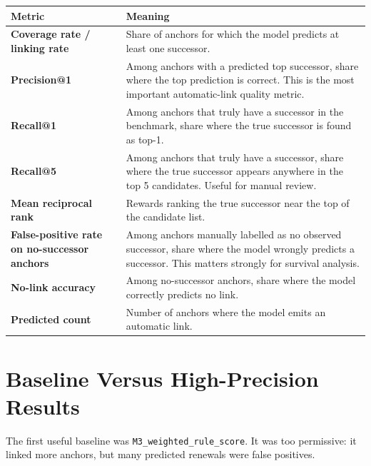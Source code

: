 \documentclass[11pt,a4paper]{article}
\newcommand{\code}[1]{\texttt{#1}}
\newcommand{\metric}[1]{\textbf{#1}}
\begin{document}
\small
\begin{longtable}{p{}p{}}
\toprule
Metric & Meaning \\
\midrule
\endhead
\metric{Coverage rate / linking rate} & Share of anchors for which the model predicts at least one successor. \\
\metric{Precision@1} & Among anchors with a predicted top successor, share where the top prediction is correct. This is the most important automatic-link quality metric. \\
\metric{Recall@1} & Among anchors that truly have a successor in the benchmark, share where the true successor is found as top-1. \\
\metric{Recall@5} & Among anchors that truly have a successor, share where the true successor appears anywhere in the top 5 candidates. Useful for manual review. \\
\metric{Mean reciprocal rank} & Rewards ranking the true successor near the top of the candidate list. \\
\metric{False-positive rate on no-successor anchors} & Among anchors manually labelled as no observed successor, share where the model wrongly predicts a successor. This matters strongly for survival analysis. \\
\metric{No-link accuracy} & Among no-successor anchors, share where the model correctly predicts no link. \\
\metric{Predicted count} & Number of anchors where the model emits an automatic link. \\
\bottomrule
\end{longtable}
\normalsize

\section*{Baseline Versus High-Precision Results}

The first useful baseline was \code{M3\_weighted\_rule\_score}. It was too permissive: it linked more anchors, but many predicted renewals were false positives.
\end{document}
